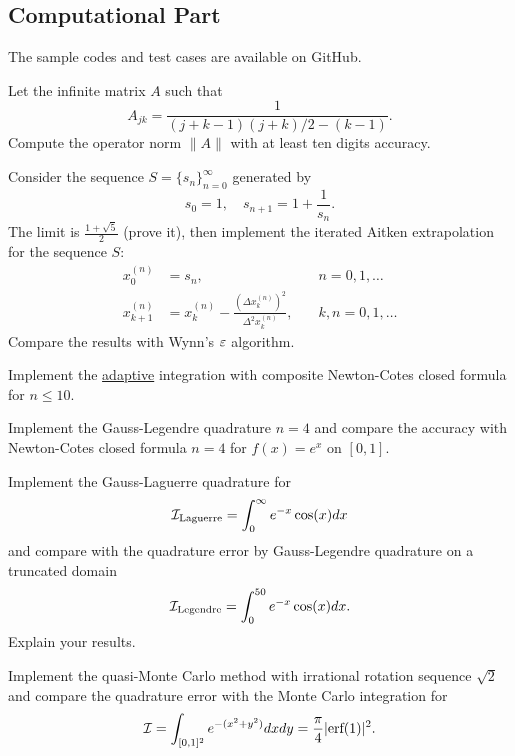 \subsection{Computational Part}
The sample codes and test cases are available on GitHub. 
\begin{problem}
    Let the infinite matrix $A$ such that $$A_{jk} = \frac{1}{(j+k-1)(j+k)/2 - (k-1)}.$$
    Compute the operator norm $\|A\|$ with at least ten digits accuracy.
\end{problem}
\begin{problem}\label{Exer: 4-It-Aitken}
    Consider the sequence $S = \{s_n\}_{n = 0}^{\infty}$ generated by 
    \begin{equation}
        s_0 = 1,\quad s_{n+1} = 1 + \frac{1}{s_{n}}.
    \end{equation}
    The limit is $\frac{1+\sqrt{5}}{2}$ (prove it), then implement the iterated Aitken extrapolation for the sequence $S$: 
    \begin{equation}
    \begin{aligned}
           x_0^{(n)} &= s_n ,\quad &n = 0, 1, \dots\\
           x_{k+1}^{(n)} &= x_k^{(n)} - \frac{( \Delta x_{k}^{(n)} )^2}{\Delta^2 x_k^{(n)}}, \quad &k, n = 0, 1, \dots
    \end{aligned}
    \end{equation}
    Compare the results with Wynn's $\varepsilon$ algorithm.
\end{problem}
\begin{problem}
    Implement the \underline{adaptive} integration with composite Newton-Cotes closed formula for $n \le 10$. 
\end{problem}

\begin{problem}
    Implement the Gauss-Legendre quadrature $n=4$ and compare the accuracy with Newton-Cotes closed formula $n=4$ for $f(x) = e^x$ on $[0, 1]$.
\end{problem}
\begin{problem}
    Implement the Gauss-Laguerre quadrature for 
    \begin{equation}
        \mathcal I_{\textrm{Laguerre}} = \int_0^{\infty} e^{-x} \cos(x) dx 
    \end{equation}
    and compare with the quadrature error by Gauss-Legendre quadrature on a truncated domain 
    \begin{equation}
        \mathcal I_{\textrm{Legendre}} = \int_{0}^{50} e^{-x} \cos(x) dx.
    \end{equation}
    Explain your results.
\end{problem}
\begin{problem}
    Implement the quasi-Monte Carlo method with irrational rotation sequence $\sqrt{2}$ and compare the quadrature error with the Monte Carlo integration for  
    $$\mathcal I = \int_{[0, 1]^2} e^{ -(x^2 + y^2) } dx d y = \frac{\pi}{4} |\textrm{erf}(1)|^2. $$
\end{problem}



